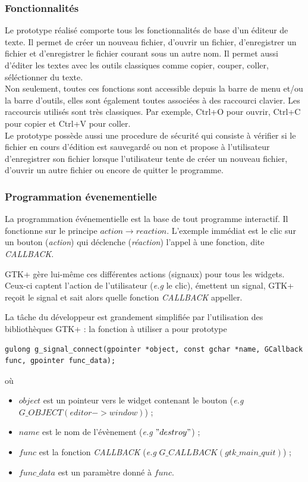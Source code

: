 \subsubsection*{Fonctionnalités}
Le prototype réalisé comporte tous les fonctionnalités de base d'un
éditeur de texte. Il permet de créer un nouveau fichier, d'ouvrir un
fichier, d'enregistrer un fichier et d'enregistrer le fichier courant
sous un autre nom. Il permet aussi d'éditer les textes avec les outils
classiques comme copier, couper, coller, séléctionner du texte.
\\ Non seulement, toutes ces fonctions sont accessible depuis la barre
de menu et/ou la barre d'outils, elles sont également toutes associées
à des raccourci clavier. Les raccourcis utilisés sont très
classiques. Par exemple, Ctrl+O pour ouvrir, Ctrl+C pour copier et
Ctrl+V pour coller.
\\ Le prototype possède aussi une procedure de
sécurité qui consiste à vérifier si le fichier en cours d'édition est
sauvegardé ou non et propose à l'utilisateur d'enregistrer son
fichier lorsque l'utilisateur tente de créer un nouveau fichier,
d'ouvrir un autre fichier ou encore de quitter le programme.


\subsubsection{Programmation évenementielle}

La programmation événementielle est la base de tout programme interactif.
Il fonctionne sur le principe $action \rightarrow reaction$. L'exemple 
immédiat est le clic sur un bouton (\textit{action}) qui déclenche (\textit{réaction}) 
l'appel à une fonction, dite \textit{CALLBACK}.

GTK+ gère lui-même ces différentes actions (signaux) pour tous les widgets.
Ceux-ci captent l'action de l'utilisateur (\textit{e.g} le clic), émettent 
un signal, GTK+ reçoit le signal et sait alors quelle fonction \textit{CALLBACK} 
appeller.

La tâche du développeur est grandement simplifiée par l'utilisation des 
bibliothèques GTK+ : la fonction à utiliser a pour prototype
\begin{verbatim}
gulong g_signal_connect(gpointer *object, const gchar *name, GCallback func, gpointer func_data);
\end{verbatim}
où 
\begin{itemize}
\item $object$ est un pointeur vers le widget contenant le bouton (\textit{e.g} $G\_OBJECT(editor->window)$) ;
\item $name$ est le nom de l'évènement (\textit{e.g} $"destroy"$) ;
\item $func$ est la fonction \textit{CALLBACK} (\textit{e.g} $G\_CALLBACK(gtk\_main\_quit)$) ;
\item $func\_data$ est un paramètre donné à $func$.
\end{itemize}


